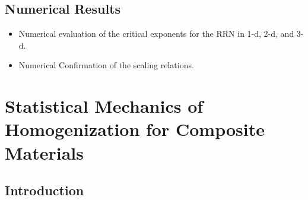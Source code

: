 \documentclass[english,12pt]{ttuthes}
\begin{document}
\subsection{Numerical Results}
\label{subsec:Num_Res_Crit_Behav_of_Transport}
\begin{itemize}
\item Numerical evaluation of the critical exponents for the RRN in
  1-d, 2-d, and 3-d.
\item Numerical Confirmation of the scaling relations.  
\end{itemize}
%
\section{Statistical Mechanics of Homogenization for Composite
  Materials}
\label{sec:StatMech_of_Composites}
%
\subsection{Introduction} \label{sec:Intro_Stat_Mech_Comp}
%
\end{document}
